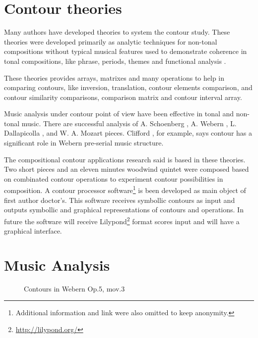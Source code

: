 \section{Contour theories}
\label{sec:contour-theories}

Many authors
\cite{friedmann85:methodology,friedmann87:response,morris87:composition,morris93:directions,marvin.ea87:relating,marvin88:generalized,marvin.ea95:generalization,polansky.ea92:possible,quinn97:fuzzy,clifford95:contour,beard03:contour}
have developed theories to system the contour study. These theories
were developed primarily as analytic techniques for non-tonal
compositions without typical musical features used to demonstrate
coherence in tonal compositions, like phrase, periods, themes and
functional analysis \cite{beard03:contour}.

These theories provides arrays, matrixes and many operations to help
in comparing contours, like inversion, translation, contour elements
comparison, and contour similarity comparisons, comparison matrix and
contour interval array.

Music analysis under contour point of view have been effective in
tonal and non-tonal music. There are successful analysis of A.
Schoenberg \cite{friedmann85:methodology}, A. Webern
\cite{clifford95:contour}, L. Dallapicolla
\cite{marvin88:generalized}, and W. A. Mozart \cite{beard03:contour}
pieces. Clifford \cite{clifford95:contour}, for example, says contour
has a significant role in Webern pre-serial music structure.

The compositional contour applications research said is based in these
theories. Two short pieces and an eleven minutes woodwind quintet were
composed based on combinated contour operations to experiment contour
possibilities in composition. A contour processor
software\footnote{Additional information and link were also omitted to
  keep anonymity.} is been developed as main object of first author
doctor's. This software receives symbollic contours as input and
outputs symbollic and graphical representations of contours and
operations. In future the software will receive
Lilypond\footnote{\url{http://lilypond.org/}} format scores input and
will have a graphical interface.

\section{Music Analysis}
\label{sec:music-analysis}

\begin{figure}[!p]
  \centering

  \quad
  \caption{Contours in Webern Op.5, mov.3}
  \label{fig:exemplos-webern}
\end{figure}


